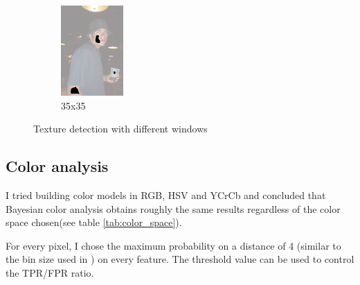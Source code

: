 \documentclass[12pt]{report}
\begin{document}
\begin{figure}[h!]
\begin{subfigure}[b]{0.3\linewidth}
			\includegraphics[width=\linewidth]{resources/texture_35_35.png}
			\caption{35x35}
		\end{subfigure}
		\caption{Texture detection with different windows}
		\label{fig:texture}
	\end{figure}
	
	\subsection{Color analysis}
	I tried building color models in RGB, HSV and YCrCb and concluded that Bayesian color analysis obtains roughly the same results regardless of the color space chosen(see table \ref{tab:color_space}). 
	
	For every pixel, I chose the maximum probability on a distance of 4 (similar to the bin size used in \cite{compaq}) on every feature. The threshold value can be used to control the TPR/FPR ratio.
	
\end{document}
